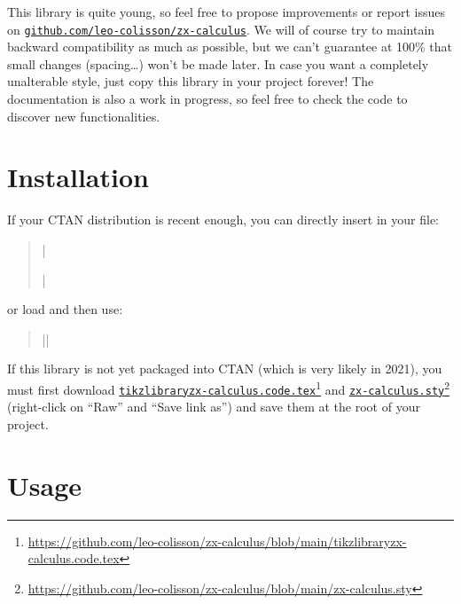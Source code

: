 \documentclass[a4paper]{ltxdoc}
\newcommand{\mylink}[2]{\href{#1}{#2}\footnote{\url{#1}}}
\begin{document}
This library is quite young, so feel free to propose improvements or report issues on \href{https://github.com/leo-colisson/zx-calculus}{\texttt{github.com/leo-colisson/zx-calculus}}. We will of course try to maintain backward compatibility as much as possible, but we can't guarantee at 100\% that small changes (spacing\dots{}) won't be made later. In case you want a completely unalterable style, just copy this library in your project forever! The documentation is also a work in progress, so feel free to check the code to discover new functionalities.

\section{Installation}

If your CTAN distribution is recent enough, you can directly insert in your file:
\begin{verse}
  |\usepackage{zx-calculus}|%
\end{verse}
or load \tikzname{} and then use:
\begin{verse}%
   |\usetikzlibrary{zx-calculus}|%
\end{verse}
If this library is not yet packaged into CTAN (which is very likely in 2021), you must first download \mylink{https://github.com/leo-colisson/zx-calculus/blob/main/tikzlibraryzx-calculus.code.tex}{\texttt{tikzlibraryzx-calculus.code.tex}} and \mylink{https://github.com/leo-colisson/zx-calculus/blob/main/zx-calculus.sty}{\texttt{zx-calculus.sty}} (right-click on ``Raw'' and ``Save link as'') and save them at the root of your project.

\section{Usage}
\end{document}

